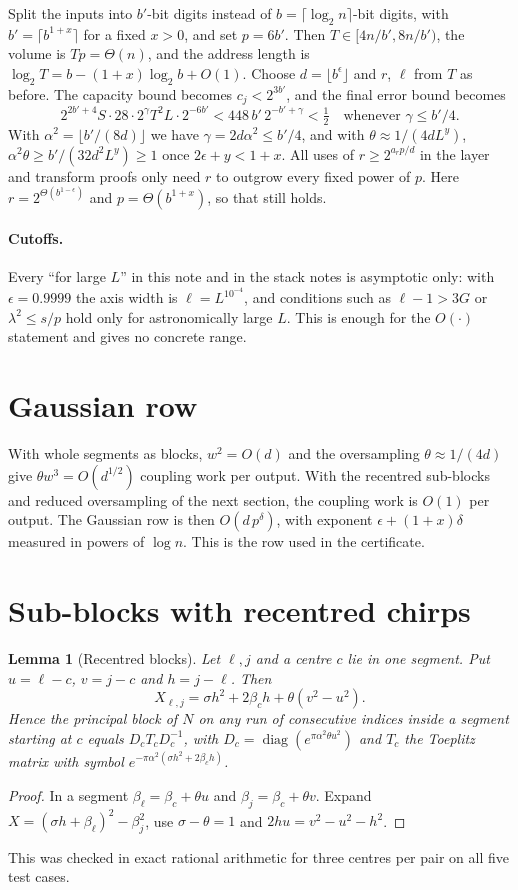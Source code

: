 \documentclass[11pt]{article}
\newtheorem{lemma}{Lemma}
\theoremstyle{remark}\newtheorem*{remark}{Remark}
\begin{document}
Split the inputs into $b'$-bit digits instead of $b=\lceil\log_2n\rceil$-bit digits, with
$b'=\lceil b^{1+x}\rceil$ for a fixed $x>0$, and set $p=6b'$. Then $T\in[4n/b',8n/b')$,
the volume is $Tp=\Theta(n)$, and the address length is $\log_2T=b-(1+x)\log_2b+O(1)$.
Choose $d=\lfloor b^\epsilon\rfloor$ and $r$, $\ell$ from $T$ as before.
The capacity bound becomes $c_j<2^{3b'}$, and the final error bound becomes
\[
 2^{2b'+4}S\cdot28\cdot2^\gamma T^2L\cdot2^{-6b'}<448\,b'\,2^{-b'+\gamma}<\tfrac12
 \quad\text{whenever }\gamma\le b'/4 .
\]
With $\alpha^2=\lfloor b'/(8d)\rfloor$ we have $\gamma=2d\alpha^2\le b'/4$, and with
$\theta\approx1/(4dL^y)$, $\alpha^2\theta\ge b'/(32d^2L^y)\ge1$ once $2\epsilon+y<1+x$. All uses of
$r\ge2^{a_rp/d}$ in the layer and transform proofs only need $r$ to outgrow every fixed
power of $p$. Here $r=2^{\Theta(b^{1-\epsilon})}$ and $p=\Theta(b^{1+x})$, so that still holds.

\paragraph{Cutoffs.} Every ``for large $L$'' in this note and in the stack notes is asymptotic only: with $\epsilon=0.9999$ the axis width is $\ell=L^{10^{-4}}$, and conditions such as $\ell-1>3G$ or $\lambda^2\le s/p$ hold only for astronomically large $L$. This is enough for the $O(\cdot)$ statement and gives no concrete range.

\section{Gaussian row}

With whole segments as blocks, $w^2=O(d)$ and the oversampling $\theta\approx1/(4d)$ give
$\theta w^3=O(d^{1/2})$ coupling work per output. With the recentred sub-blocks and reduced
oversampling of the next section, the coupling work is $O(1)$ per output. The Gaussian row is
then $O(d\,p^\delta)$, with exponent $\epsilon+(1+x)\delta$ measured in powers of $\log n$. This
is the row used in the certificate.

\section{Sub-blocks with recentred chirps}

\begin{lemma}[Recentred blocks]\label{lem:recentred}
Let $\ell,j$ and a centre $c$ lie in one segment. Put $u=\ell-c$, $v=j-c$ and $h=j-\ell$. Then
\[
 X_{\ell,j}=\sigma h^2+2\beta_ch+\theta(v^2-u^2).
\]
Hence the principal block of $N$ on any run of consecutive indices inside a segment
starting at $c$ equals $D_cT_cD_c^{-1}$, with $D_c=\operatorname{diag}(e^{\pi\alpha^2\theta u^2})$ and
$T_c$ the Toeplitz matrix with symbol $e^{-\pi\alpha^2(\sigma h^2+2\beta_ch)}$.
\end{lemma}
\begin{proof}
In a segment $\beta_\ell=\beta_c+\theta u$ and $\beta_j=\beta_c+\theta v$. Expand
$X=(\sigma h+\beta_\ell)^2-\beta_j^2$, use $\sigma-\theta=1$ and $2hu=v^2-u^2-h^2$.
\end{proof}
This was checked in exact rational arithmetic for three centres per pair on all five test cases.
\end{document}
